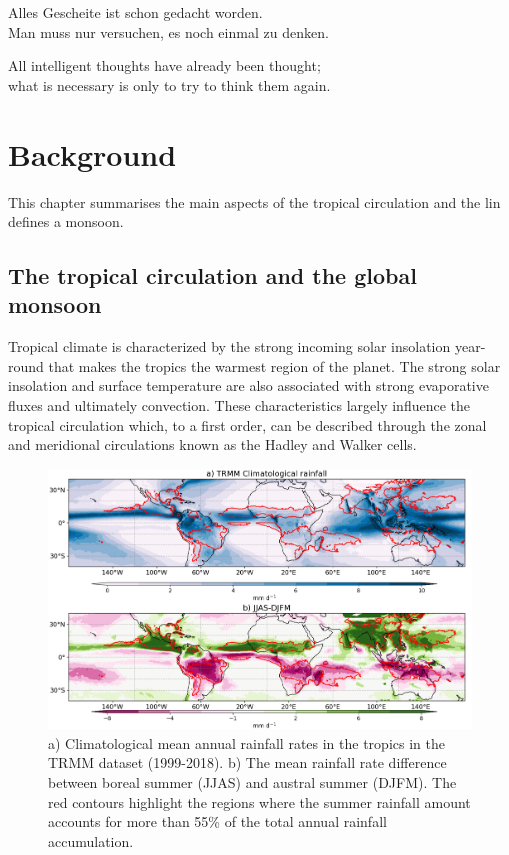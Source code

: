 \begin{savequote}[8cm]
Alles Gescheite ist schon gedacht worden.\\
Man muss nur versuchen, es noch einmal zu denken.

All intelligent thoughts have already been thought;\\
what is necessary is only to try to think them again.
\end{savequote}

\chapter{\label{ch:2-litreview}Background}

\minitoc
 This chapter summarises the main aspects of the tropical circulation and the lin defines a monsoon. 
\section{The tropical circulation and the global monsoon}\label{sq:bk_tropics}

Tropical climate is characterized by the strong incoming solar insolation year-round that makes the tropics the warmest region of the planet. 
The strong solar insolation and surface temperature are also associated with strong evaporative fluxes and ultimately convection. 
 These characteristics largely influence the tropical circulation which, to a first order, can be described through the zonal and meridional circulations known as the Hadley and Walker cells. 
 
 


\begin{figure}
\includegraphics[width=\linewidth]{figures/trmmclima.png}
\caption{a) Climatological mean annual rainfall rates in the tropics in the TRMM dataset (1999-2018). b) The mean rainfall rate difference between boreal summer (JJAS) and austral summer (DJFM). The red contours highlight the regions where the summer rainfall amount accounts for more than 55\% of the total annual rainfall accumulation. }
\label{fig:monsoon}
\end{figure}

